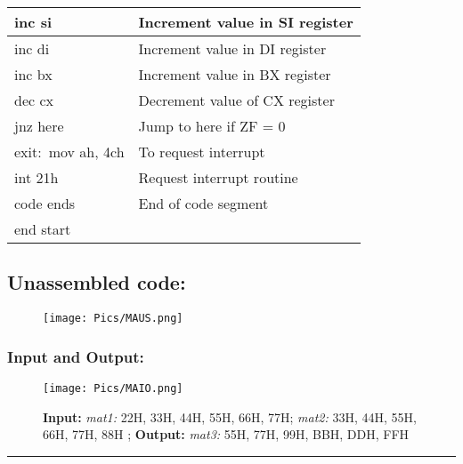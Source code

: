 \documentclass[10pt,a4paper]{article}
\begin{document}
\begin{flushleft}
\begin{table}[htb]
{\begin{tabular}{|l|l|}
\hline
inc si                                                           & Increment value in SI register                \\
\hline 
inc di                                                           & Increment value in DI register                \\
\hline
inc bx                                                           & Increment value in BX register                \\         
\hline
dec cx                                                           & Decrement value of CX register                \\
\hline
jnz here                                                         & Jump to here if ZF = 0                        \\
\hline
exit:~mov ah, 4ch                                                & To request interrupt                          \\
\hline
int 21h                                                          & Request interrupt routine                     \\ 
\hline
code ends                                                        & End of code segment                           \\
\hline
end start                                                        &                                               \\
\hline
\end{tabular}
}
\end{table}

\newpage
\subsection*{\textbf{Unassembled code:}}
\begin{figure}[h]
    \centering
    \texttt{[image: Pics/MAUS.png]}
\end{figure}
\subsubsection*{\textbf{Input and Output:}}
\begin{figure}[h]
    \centering
    \texttt{[image: Pics/MAIO.png]}
    \caption{ \textbf{Input:} \emph{mat1:} 22H, 33H, 44H, 55H, 66H, 77H; \emph{mat2:} 33H, 44H, 55H, 66H, 77H, 88H ; \newline \hspace{1cm}
              \textbf{Output:} \emph{mat3:} 55H, 77H, 99H, BBH, DDH, FFH}
\end{figure}
\hrule
\newpage

\end{flushleft}
\end{document}
